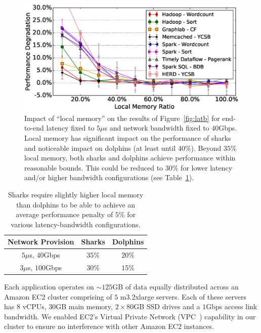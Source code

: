 \begin{figure}[h]
  \centering
    \includegraphics[width=\columnwidth]{img/vary_remote_mem.eps} 
  \caption{\small{Impact of ``local memory'' on the results of Figure~\ref{fig:latb} for end-to-end latency fixed to $5\mu$s and network bandwidth fixed to $40$Gbps. Local memory has significant impact on the performance of sharks and noticeable impact on dolphins (at least until $40\%$). Beyond $35\%$ local memory, both sharks and dolphins achieve performance within reasonable bounds. This could be reduced to $30\%$ for lower latency and/or higher bandwidth configurations (see Table~\ref{tab:rmem}).}}
  \label{fig:impb}
\end{figure}
%
%
\begin{table}
    \centering
    \small
    \begin{tabular}{c|c|c}
    \textbf{Network Provision} & \textbf{Sharks} & \textbf{Dolphins}\\
    \hline\hline
    $5\mu$s, $40$Gbps & $35$\% & $20$\%\\\hline
    $3\mu$s, $100$Gbps & $30$\% & $15$\%\\\hline\hline
    \end{tabular}
    \caption{Sharks require slightly higher local memory than dolphins to be able to achieve an average performance penalty of $5\%$ for various latency-bandwidth configurations.}
    \label{tab:rmem}
\end{table}
%

Each application operates on $\sim125$GB of data equally distributed across an Amazon EC2 cluster comprising of $5$ m3.2xlarge servers. Each of these servers has $8$ vCPUs, $30$GB main memory, $2 \times 80$GB SSD drives and a $1$Gbps access link bandwidth.
We enabled EC2's Virtual Private Network (VPC~\cite{vpc}) capability in our cluster to ensure no interference with other Amazon EC2 instances. 
 
